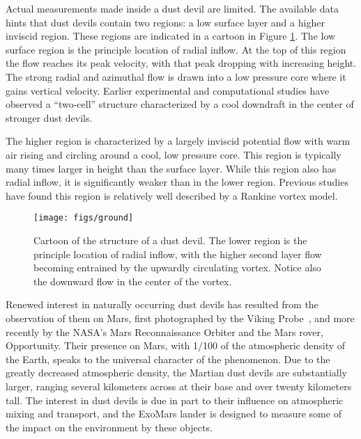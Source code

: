 %
%

Actual measurements made inside a dust devil are limited. The available
data hints that dust devils contain two regions: a low surface layer and
a higher inviscid region. These regions are indicated in a 
cartoon in Figure \ref{fig:cartoon}. The low surface region is the
principle location of radial inflow. At the top of this region the flow
reaches its peak velocity, with that peak dropping with increasing
height. The strong radial and azimuthal flow is drawn into a low
pressure core where it gains vertical velocity. Earlier experimental and  
computational studies have observed a ``two-cell'' structure
characterized by a cool downdraft in the center of stronger dust
devils\cite{doi:10.3137/ao.420105,Sinclair1973}. 

The higher region is characterized by a largely inviscid potential flow
with warm air rising and circling around a cool, low pressure
core. This region is typically many times larger in height than the
surface layer. While this region also has radial inflow, it is
significantly weaker than in the lower region. Previous studies have found
this region is relatively well described by a Rankine vortex
model\cite{Sinclair1973,logan1971approach,tratt2003situ}. 

  \begin{figure}[!htb]
    \begin{center}
     \texttt{[image: figs/ground]}
     \caption{Cartoon of the structure of a dust devil. The lower region
     is the principle location of radial inflow, with the higher second
     layer flow becoming entrained by the upwardly circulating
     vortex. Notice also the downward flow in the center of the vortex.}
     \label{fig:cartoon}
    \end{center}
  \end{figure}


Renewed interest in naturally occurring dust devils has resulted from
the observation of them on Mars, first photographed by the Viking
Probe~\cite{ryan1983possible}, and more recently by the NASA's Mars
Reconnaissance Orbiter and the Mars rover, Opportunity. Their presence
on Mars, with 1/100 of the atmospheric density of the Earth, speaks to
the universal character of the phenomenon. Due to the greatly decreased
atmospheric density, the Martian dust devils are substantially larger,
ranging several kilometers across at their base and over twenty
kilometers tall\cite{Reiss2016315}. The interest in dust devils is due
in part to their influence on atmospheric mixing and transport, and the
ExoMars lander is designed to measure some of the impact on the
environment by these objects\cite{renno_comm}.  

